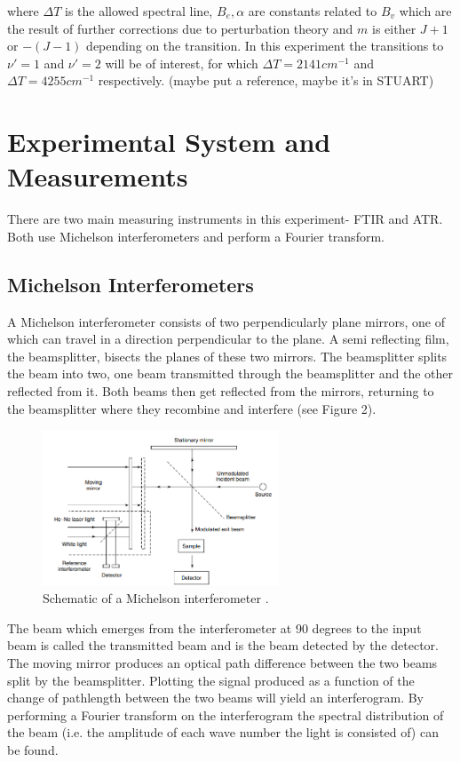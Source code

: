\documentclass[reprint,amsmath,amssymb,aps, prl]{revtex4-2}
\begin{document}
where $\Delta T$ is the allowed spectral line, $B_{e},\alpha $ are constants related to $B_{v}$  which are the result of further corrections due to perturbation theory and $m$ is either $J+1$ or $-(J-1)$  depending on the transition. In this experiment the transitions to $\nu'=1$ and $\nu' =2$ will be of interest, for which $\Delta T=2141cm^{-1}$ and $\Delta T = 4255 cm^{-1}$ respectively. (maybe put a reference, maybe it's in STUART)


\section{Experimental System and Measurements}
There are two main measuring instruments in this experiment- FTIR and ATR. Both use Michelson interferometers and perform a Fourier transform.

\subsection{Michelson Interferometers}
A Michelson interferometer consists of two perpendicularly plane mirrors, one of which can travel in a direction perpendicular to the plane. A semi reflecting film, the beamsplitter, bisects the planes of these two mirrors. The beamsplitter splits the beam into two, one beam transmitted through the beamsplitter and the other reflected from it. Both beams then get reflected from the mirrors, returning to the beamsplitter where they recombine and interfere \cite{stuart} (see Figure 2). 
\begin{figure}[h]
    \includegraphics[width=7cm]{Images/INTERFEROMETER.png}
    \caption{Schematic of a Michelson interferometer \cite{stuart}.}
    \label{fig:Interferometer}
    \centering
\end{figure}
The beam which emerges from the interferometer at 90 degrees to the input beam is called the transmitted beam and is the beam detected by the detector. The moving mirror produces an optical path difference between the two beams split by the beamsplitter. Plotting the signal produced as a function of the change of pathlength between the two beams will yield an interferogram. By performing a Fourier transform on the interferogram the spectral distribution of the beam (i.e. the amplitude of each wave number the light is consisted of) can be found.
\end{document}
